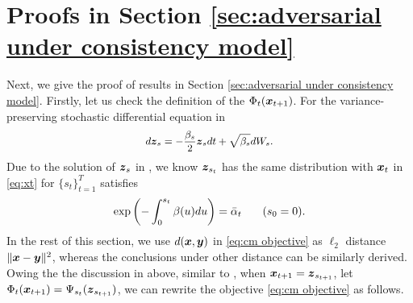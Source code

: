 
\section{Proofs in Section \ref{sec:adversarial under consistency model}}\label{app:proofs of consistency model}
Next, we give the proof of results in Section \ref{sec:adversarial under consistency model}. Firstly, let us check the definition of the $\Phi_{t}(\boldsymbol{x}_{t + 1})$. For the variance-preserving stochastic differential equation in \citet{song2020denoising}
\begin{equation}\label{eq:sde}
    \small
        d\boldsymbol{z}_{s} = -\frac{\beta_{s}}{2}\boldsymbol{z}_{s}dt + \sqrt{\beta_{s}}dW_{s}.
\end{equation}
Due to the solution of $\boldsymbol{z}_{s}$ in \citet{song2023consistency}, we know $\boldsymbol{z}_{s_{t}}$ has the same distribution with $\boldsymbol{x}_{t}$ in \eqref{eq:xt} for $\{s_{t}\}_{t=1}^{T}$ satisfies 
\begin{equation}
    \small
        \exp\left(-\int_{0}^{s_{t}}\beta(u)du\right) = \bar{\alpha}_{t} \qquad (s_{0} = 0).    
\end{equation}
In the rest of this section, we use $d(\boldsymbol{x}, \boldsymbol{y})$ in \eqref{eq:cm objective} as $\ell_{2}$ distance $\|\boldsymbol{x} - \boldsymbol{y}\|^{2}$, whereas the conclusions under other distance can be similarly derived.
Owing the the discussion in above, similar to \citep{song2023consistency}, when $\boldsymbol{x}_{t + 1} = \boldsymbol{z}_{s_{t + 1}}$, let $\Phi_{t}(\boldsymbol{x}_{t + 1}) = \Psi_{s_{t}}(\boldsymbol{z}_{s_{t + 1}})$, we can rewrite the objective \eqref{eq:cm objective} as follows. 

